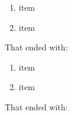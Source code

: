 \documentclass{article}
\begin{document}
\begin{enumerate}
\item item
\item item
\end{enumerate}

That ended with: \theenumi

\begin{enumerate}[resume]
\item item
\item item
\end{enumerate}

That ended with: \theenumi
\end{document}
